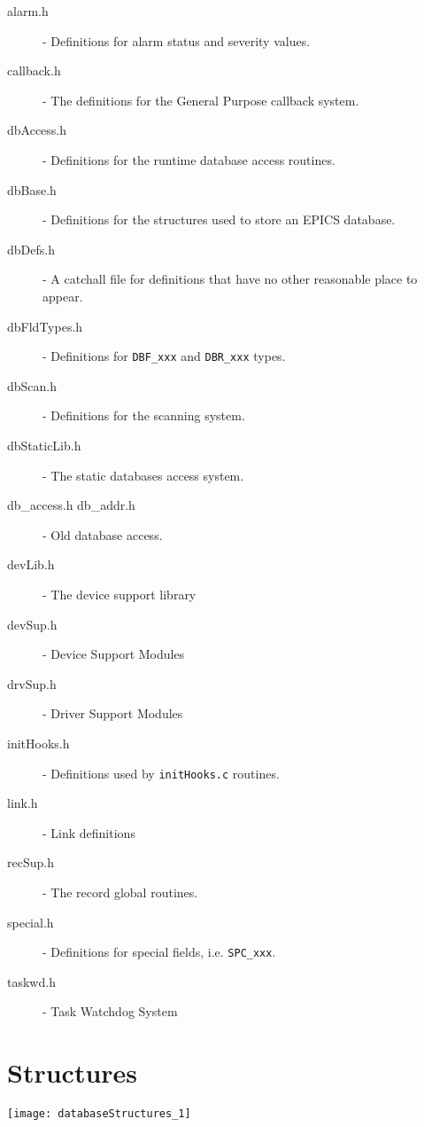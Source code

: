 \begin{description}

\item[alarm.h] - Definitions for alarm status and severity values.

\item[callback.h] - The definitions for the General Purpose callback system.

\item[dbAccess.h] - Definitions for the runtime database access routines.

\item[dbBase.h] - Definitions for the structures used to store an EPICS database.

\item[dbDefs.h] - A catchall file for definitions that have no other reasonable place to appear.

\item[dbFldTypes.h] - Definitions for \verb|DBF_xxx| and \verb|DBR_xxx| types.

\item[dbScan.h] - Definitions for the scanning system.

\item[dbStaticLib.h] - The static databases access system.

\item[db\_access.h db\_addr.h] - Old database access.

\item[devLib.h] - The device support library

\item[devSup.h] - Device Support Modules

\item[drvSup.h] - Driver Support Modules

\item[initHooks.h] - Definitions used by \verb|initHooks.c| routines.

\item[link.h] - Link definitions

\item[recSup.h] - The record global routines.

\item[special.h] - Definitions for special fields, i.e. \verb|SPC_xxx|.

\item[taskwd.h] - Task Watchdog System

\end{description}

\newpage

\section{Structures}

\begin{center}

\texttt{[image: databaseStructures\_1]}

\end{center}
